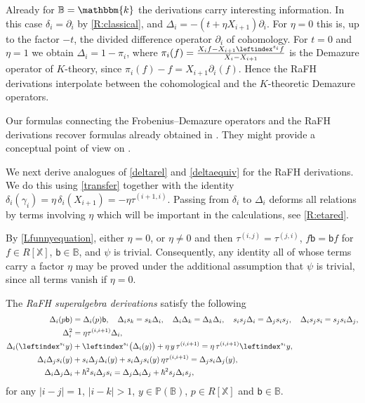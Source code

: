 \documentclass[a4paper,11pt]{amsart}
\numberwithin{equation}{subsection}
\theoremstyle{definition}
\theoremstyle{theorem}
\theoremstyle{remark}
\newcommand\bb{\mathsf{b}}
\newcommand\Po{\mathbb{P}(\mathbb{B})}
\newcommand\X{\mathbb{X}}
\newcommand\kk{\mathbbm{k}}
\newcommand{\Bo}{\mathbb{B}}
\begin{document}
\begin{Remark}\label{RkDemop}
Already  for $\Bo=\kk$ the derivations carry  interesting information. In this case $\delta_i=\partial_i$ by \autoref{R:classical}, and $\Delta_i=-(t+\eta X_{i+1})\partial_i$. For $\eta=0$ this is, up to the factor $-t$, the divided difference operator $\partial_i$ of cohomology. For $t=0$ and $\eta=1$ we obtain $\Delta_i=1-\pi_i$, where $\pi_i(f)=\frac{X_if-X_{i+1}\leftindex^{s_i}{f}}{X_i-X_{i+1}}$ is the Demazure operator of $K$-theory, since $\pi_i(f)-f=X_{i+1}\partial_i(f)$. Hence the RaFH derivations interpolate between the cohomological and the $K$-theoretic Demazure operators.

Our formulas connecting the Frobenius--Demazure operators and
  the RaFH derivations recover formulas already obtained in
  \cite[Lemma~4.3]{Savage:AffineWreath}. They might provide a conceptual point of view on \cite{RossoSavage:QuantumAffineWreath}.
\end{Remark}

We next derive analogues of \autoref{deltarel} and \autoref{deltaequiv}
for the RaFH derivations. We do this using
\autoref{transfer} together with the identity
$\delta_i(\gamma_i)=\eta\,\delta_i(X_{i+1})=-\eta\tau^{(i+1,i)}$.
Passing from $\delta_i$ to $\Delta_i$ deforms all relations by terms involving $\eta$ which will be important in the calculations, see \autoref{R:etared}.

\begin{Remark}\label{R:etared}
  By \autoref{Lfunnyequation}, either $\eta=0$, or $\eta\not=0$ and then
  $\tau^{(i,j)}=\tau^{(j,i)}$, $f\bb=\bb f$ for $f\in R[\X]$,
  $\bb\in\Bo$, and $\psi$ is trivial. Consequently, any identity
  all of whose terms carry a factor $\eta$ may be proved under the
  additional assumption that $\psi$ is trivial, since all
  terms vanish if $\eta=0$.
\end{Remark}

\begin{Lemma}\label{RaFHDer}
The \emph{RaFH superalgebra derivations} satisfy the following
\begin{align}
 \Delta_i(p\bb)&=\Delta_i(p)\bb,\quad
 \Delta_is_k=s_k\Delta_i,\quad\Delta_i\Delta_k=\Delta_k\Delta_i,\quad
 s_is_j\Delta_i=\Delta_js_is_j,\quad \Delta_is_js_i=s_js_i\Delta_j,
 \label{RaFHDerA}\\
 \Delta_i^2&=\eta\tau^{(i,i+1)}\Delta_i,
 \label{RaFHDerB}\\
 \Delta_i(\leftindex^{s_i}y)&+\leftindex^{s_i}{\bigl(\Delta_i(y)\bigr)}+\eta\, y\,\tau^{(i,i+1)}
    =\eta\,\tau^{(i,i+1)}\leftindex^{s_i}y,
 \label{RaFHDerC}\\
 \Delta_i\Delta_js_i(y)&+s_i\Delta_j\Delta_i(y)+s_i\Delta_js_i(y)\,\eta\tau^{(i,i+1)}
    =\Delta_js_i\Delta_j(y),
 \label{RaFHDerD}\\
 \Delta_i\Delta_j\Delta_i&+\hbar^2s_i\Delta_js_i
    =\Delta_j\Delta_i\Delta_j+\hbar^2s_j\Delta_is_j,
 \label{RaFHDerE}
\end{align}
for any $|i-j|=1$, $|i-k|>1$, $y\in\Po$, $p\in R[\X]$ and $\bb\in\Bo$.
\end{Lemma}
\end{document}
